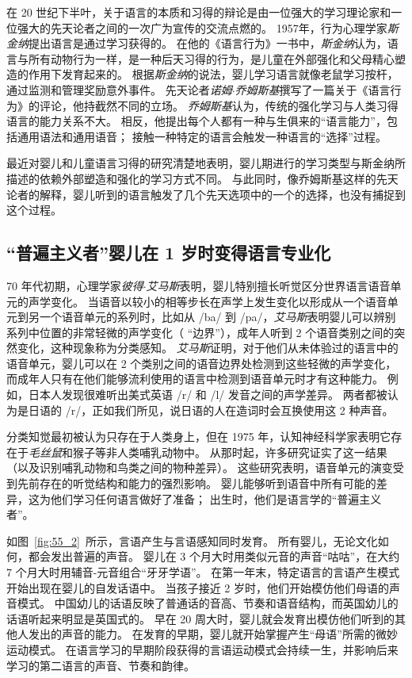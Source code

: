 在 20 世纪下半叶，关于语言的本质和习得的辩论是由一位强大的学习理论家和一位强大的先天论者之间的一次广为宣传的交流点燃的。
1957年，行为心理学家\textit{斯金纳}提出语言是通过学习获得的。
在他的《语言行为》一书中，\textit{斯金纳}认为，语言与所有动物行为一样，是一种后天习得的行为，是儿童在外部强化和父母精心塑造的作用下发育起来的。
根据\textit{斯金纳}的说法，婴儿学习语言就像老鼠学习按杆，通过监测和管理奖励意外事件。
先天论者\textit{诺姆$\cdot$乔姆斯基}撰写了一篇关于《语言行为》的评论，他持截然不同的立场。
\textit{乔姆斯基}认为，传统的强化学习与人类习得语言的能力关系不大。
相反，他提出每个人都有一种与生俱来的“语言能力”，包括通用语法和通用语音；
接触一种特定的语言会触发一种语言的“选择”过程。


最近对婴儿和儿童语言习得的研究清楚地表明，婴儿期进行的学习类型与斯金纳所描述的依赖外部塑造和强化的学习方式不同。
与此同时，像乔姆斯基这样的先天论者的解释，婴儿听到的语言触发了几个先天选项中的一个的选择，也没有捕捉到这个过程。



\subsection{“普遍主义者”婴儿在 1 岁时变得语言专业化}

70 年代初期，心理学家\textit{彼得$\cdot$艾马斯}表明，婴儿特别擅长听觉区分世界语言语音单元的声学变化。
当语音以较小的相等步长在声学上发生变化以形成从一个语音单元到另一个语音单元的系列时，比如从 /ba/ 到 /pa/，\textit{艾马斯}表明婴儿可以辨别系列中位置的非常轻微的声学变化（ “边界”），成年人听到 2 个语音类别之间的突然变化，这种现象称为分类感知。
\textit{艾马斯}证明，对于他们从未体验过的语言中的语音单元，婴儿可以在 2 个类别之间的语音边界处检测到这些轻微的声学变化，而成年人只有在他们能够流利使用的语言中检测到语音单元时才有这种能力。
例如，日本人发现很难听出美式英语 /r/ 和 /l/ 发音之间的声学差异。
两者都被认为是日语的 /r/，正如我们所见，说日语的人在造词时会互换使用这 2 种声音。


分类知觉最初被认为只存在于人类身上，但在 1975 年，认知神经科学家表明它存在于\textit{毛丝鼠}和猴子等非人类哺乳动物中。
从那时起，许多研究证实了这一结果（以及识别哺乳动物和鸟类之间的物种差异）。
这些研究表明，语音单元的演变受到先前存在的听觉结构和能力的强烈影响。
婴儿能够听到语音中所有可能的差异，这为他们学习任何语言做好了准备；
出生时，他们是语言学的“普遍主义者”。


如图~\ref{fig:55_2}~所示，言语产生与言语感知同时发育。
所有婴儿，无论文化如何，都会发出普遍的声音。
婴儿在 3 个月大时用类似元音的声音“咕咕”，在大约 7 个月大时用辅音-元音组合“牙牙学语”。
在第一年末，特定语言的言语产生模式开始出现在婴儿的自发话语中。
当孩子接近 2 岁时，他们开始模仿他们母语的声音模式。
中国幼儿的话语反映了普通话的音高、节奏和语音结构，而英国幼儿的话语听起来明显是英国式的。
早在 20 周大时，婴儿就会发育出模仿他们听到的其他人发出的声音的能力。
在发育的早期，婴儿就开始掌握产生“母语”所需的微妙运动模式。
在语言学习的早期阶段获得的言语运动模式会持续一生，并影响后来学习的第二语言的声音、节奏和韵律。


